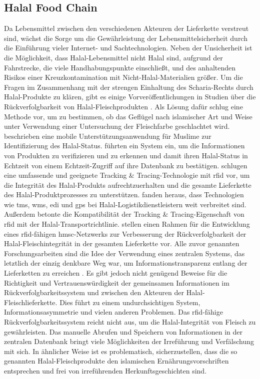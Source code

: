 \subsection{Halal Food Chain}
Da Lebensmittel zwischen den verschiedenen Akteuren der Lieferkette verstreut sind, wächst die Sorge um die Gewährleistung der Lebensmittelsicherheit durch die Einführung vieler Internet- und Sachtechnologien. Neben der Unsicherheit ist die Möglichkeit, dass Halal-Lebensmittel nicht Halal sind, aufgrund der Fahrstrecke, die viele Handhabungspunkte einschließt, und des anhaltenden Risikos einer Kreuzkontamination mit Nicht-Halal-Materialien größer. Um die Fragen im Zusammenhang mit der strengen Einhaltung des Scharia-Rechts durch Halal-Produkte zu klären, gibt es einige Vorveröffentlichungen in Studien über die Rückverfolgbarkeit von Halal-Fleischprodukten \citep{Mohammed2016}. Als Lösung dafür schlug \citet{Mohamad2016} eine Methode vor, um zu bestimmen, ob das Geflügel nach islamischer Art und Weise unter Verwendung einer Untersuchung der Fleischfarbe geschlachtet wird. \citet{Junaini2008} beschrieben eine mobile Unterstützungsanwendung für Muslime zur Identifizierung des Halal-Status. \citet{Kassim2012} führten ein System ein, um die Informationen von Produkten zu verifizieren und zu erkennen und damit ihren Halal-Status in Echtzeit von einem Echtzeit-Zugriff auf ihre Datenbank zu bestätigen. \citet{SitiSarahMohdBahrudin2011} schlugen eine umfassende und geeignete Tracking \& Tracing-Technologie mit \ac{rfid} vor, um die Integrität des Halal-Produkts aufrechtzuerhalten und die gesamte Lieferkette des Halal-Produktprozesses zu unterstützen. \citet{Tan2012} fanden heraus, dass Technologien wie \ac{tms}, \ac{wms}, \ac{edi} und \ac{gps} bei Halal-Logistikdienstleistern weit verbreitet sind. Außerdem betonte \citet{Tan2012} die Kompatibilität der Tracking \& Tracing-Eigenschaft von \ac{rfid} mit der Halal-Transportrichtlinie. \citet{Mohammed2016} stellen einen Rahmen für die Entwicklung eines \ac{rfid}-fähigen \ac{hmsc}-Netzwerks zur Verbesserung der Rückverfolgbarkeit der Halal-Fleischintegrität in der gesamten Lieferkette vor. Alle zuvor genannten Forschungsarbeiten sind die Idee der Verwendung eines zentralen Systems, das letztlich der einzig denkbare Weg war, um Informationstransparenz entlang der Lieferketten zu erreichen \citep{Tian2017}. Es gibt jedoch nicht genügend Beweise für die Richtigkeit und Vertrauenswürdigkeit der gemeinsamen Informationen im Rückverfolgbarkeitssystem und zwischen den Akteuren der Halal-Fleischlieferkette. Dies führt zu einem undurchsichtigen System, Informationsasymmetrie und vielen anderen Problemen. Das \ac{rfid}-fähige Rückverfolgbarkeitssystem reicht nicht aus, um die Halal-Integrität von Fleisch zu gewährleisten. Das manuelle Abrufen und Speichern von Informationen in der zentralen Datenbank bringt viele Möglichkeiten der Irreführung und Verfälschung mit sich. In ähnlicher Weise ist es problematisch, sicherzustellen, dass die so genannten Halal-Fleischprodukte den islamischen Ernährungsvorschriften entsprechen und frei von irreführenden Herkunftsgeschichten sind.

\newpage
